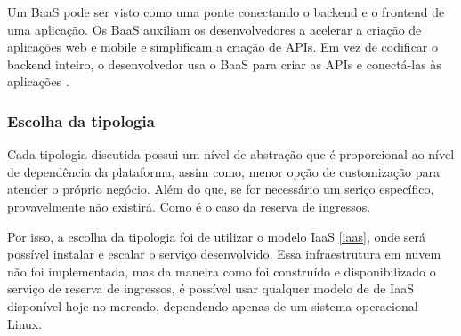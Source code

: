 \begin{citacao}
Um BaaS pode ser visto como uma ponte conectando o backend e o frontend de uma aplicação.
Os BaaS auxiliam os desenvolvedores a acelerar a criação de aplicações web e mobile e
simplificam a criação de APIs. Em vez de codificar o backend inteiro, o desenvolvedor usa
o BaaS para criar as APIs e conectá-las às aplicações \cite{backend-as-a-service-pros-e-contras}.
\end{citacao}

\subsubsection{Escolha da tipologia}

Cada tipologia discutida possui um nível de abstração que é proporcional ao nível de
dependência da plataforma, assim como, menor opção de customização para atender
o próprio negócio. Além do que, se for necessário um seriço específico, provavelmente
não existirá. Como é o caso da reserva de ingressos.

Por isso, a escolha da tipologia foi de utilizar o modelo IaaS \autoref{iaas},
onde será possível instalar e escalar o serviço desenvolvido.
Essa infraestrutura em nuvem não foi implementada, mas da maneira como foi construído
e disponibilizado o serviço de reserva de ingressos, é possível usar qualquer modelo
de de IaaS disponível hoje no mercado, dependendo apenas de um sistema operacional
Linux.


